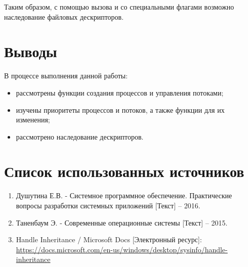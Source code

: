Таким образом, с помощью вызова  и  со специальными флагами возможно наследование файловых дескрипторов.

\section{Выводы}

В процессе выполнения данной работы:

\begin{itemize}
	\item рассмотрены функции создания процессов и управления потоками;
	\item изучены приоритеты процессов и потоков, а также функции для их изменения;
	\item рассмотрено наследование дескрипторов.
\end{itemize}

\section*{Список использованных источников}

\begin{enumerate}
	\item Душутина Е.В. - Системное программное обеспечение. Практические вопросы разработки системных приложений [Текст] -- 2016.
	\item Таненбаум Э. - Современные операционные системы [Текст] -- 2015.
	\item Handle Inheritance / Microsoft Docs [Электронный ресурс]:\\
		{\small\url{https://docs.microsoft.com/en-us/windows/desktop/sysinfo/handle-inheritance}} 
\end{enumerate}


